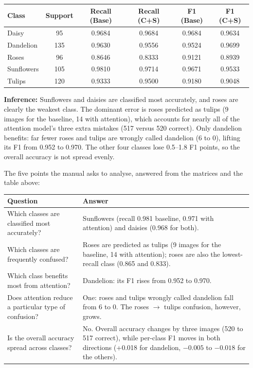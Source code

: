 \documentclass[11pt]{article}
\begin{document}
\begin{center}
\small
\begin{tabular}{|l|c|c|c|c|c|}
\hline
Class & Support & Recall (Base) & Recall (C+S) & F1 (Base) & F1 (C+S)\\
\hline
Daisy & 95 & 0.9684 & 0.9684 & 0.9684 & 0.9634\\
Dandelion & 135 & 0.9630 & 0.9556 & 0.9524 & 0.9699\\
Roses & 96 & 0.8646 & 0.8333 & 0.9121 & 0.8939\\
Sunflowers & 105 & 0.9810 & 0.9714 & 0.9671 & 0.9533\\
Tulips & 120 & 0.9333 & 0.9500 & 0.9180 & 0.9048\\
\hline
\end{tabular}
\end{center}

\textbf{Inference:} Sunflowers and daisies are classified most accurately,
and roses are clearly the weakest class. The dominant error is roses
predicted as tulips (9 images for the baseline, 14 with attention), which
accounts for nearly all of the attention model's three extra mistakes
(517 versus 520 correct). Only dandelion benefits: far fewer roses and
tulips are wrongly called dandelion (6 to 0), lifting its F1 from 0.952
to 0.970. The other four classes lose 0.5--1.8 F1 points, so the overall
accuracy is not spread evenly.

\medskip
The five points the manual asks to analyse, answered from the matrices and
the table above:

\begin{center}
\small
\begin{tabular}{|p{4.6cm}|p{11.5cm}|}
\hline
Question & Answer\\
\hline
Which classes are classified most accurately? & Sunflowers (recall 0.981 baseline, 0.971 with attention) and daisies (0.968 for both).\\
Which classes are frequently confused? & Roses are predicted as tulips (9 images for the baseline, 14 with attention); roses are also the lowest-recall class (0.865 and 0.833).\\
Which class benefits most from attention? & Dandelion: its F1 rises from 0.952 to 0.970.\\
Does attention reduce a particular type of confusion? & One: roses and tulips wrongly called dandelion fall from 6 to 0. The roses $\rightarrow$ tulips confusion, however, grows.\\
Is the overall accuracy spread across classes? & No. Overall accuracy changes by three images (520 to 517 correct), while per-class F1 moves in both directions (+0.018 for dandelion, $-0.005$ to $-0.018$ for the others).\\
\hline
\end{tabular}
\end{center}
\end{document}
